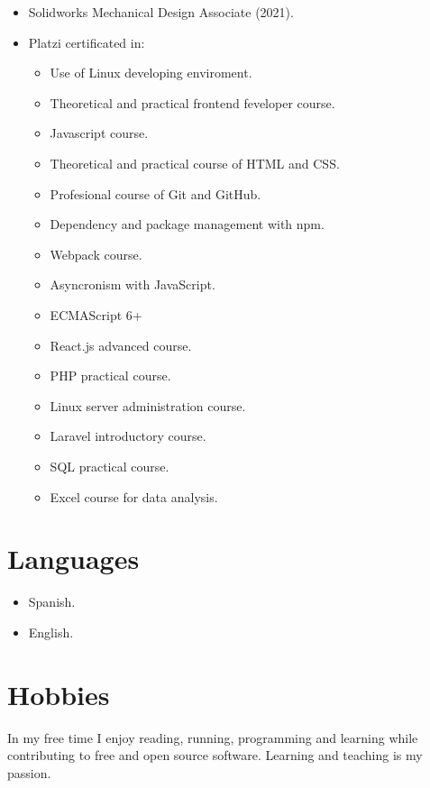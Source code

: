 \documentclass{article}
\begin{document}
  \begin{itemize}
    \item Solidworks Mechanical Design Associate (2021).
    \item Platzi certificated in:
      \begin{itemize}
        \item Use of Linux developing enviroment.
        \item Theoretical and practical frontend feveloper course.
        \item Javascript course.
        \item Theoretical and practical course of HTML and CSS.
        \item Profesional course of Git and GitHub.
        \item Dependency and package management with npm.
        \item Webpack course.
        \item Asyncronism with JavaScript.
        \item ECMAScript 6+
        \item React.js advanced course.
        \item PHP practical course.
        \item Linux server administration course.
        \item Laravel introductory course.
        \item SQL practical course.
        \item Excel course for data analysis.
      \end{itemize}
  \end{itemize}


  \section{Languages}

  \begin{itemize}
    \item Spanish.
    \item English.
  \end{itemize}


  \section{Hobbies}

  In my free time I enjoy reading, running, programming and learning while contributing to free and open source software. Learning and teaching is my passion.
\end{document}
